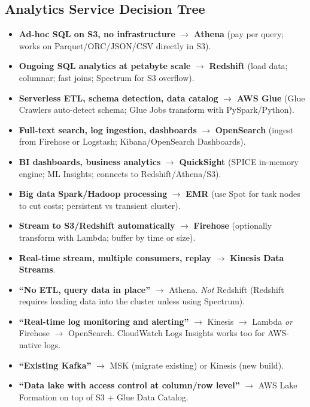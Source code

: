 \subsection{Analytics Service Decision Tree}

\begin{keyfacts}
\begin{itemize}
  \item \textbf{Ad-hoc SQL on S3, no infrastructure} $\to$ \textbf{Athena}
        (pay per query; works on Parquet/ORC/JSON/CSV directly in S3).
  \item \textbf{Ongoing SQL analytics at petabyte scale} $\to$ \textbf{Redshift}
        (load data; columnar; fast joins; Spectrum for S3 overflow).
  \item \textbf{Serverless ETL, schema detection, data catalog} $\to$ \textbf{AWS Glue}
        (Glue Crawlers auto-detect schema; Glue Jobs transform with PySpark/Python).
  \item \textbf{Full-text search, log ingestion, dashboards} $\to$ \textbf{OpenSearch}
        (ingest from Firehose or Logstash; Kibana/OpenSearch Dashboards).
  \item \textbf{BI dashboards, business analytics} $\to$ \textbf{QuickSight}
        (SPICE in-memory engine; ML Insights; connects to Redshift/Athena/S3).
  \item \textbf{Big data Spark/Hadoop processing} $\to$ \textbf{EMR}
        (use Spot for task nodes to cut costs; persistent vs transient cluster).
  \item \textbf{Stream to S3/Redshift automatically} $\to$ \textbf{Firehose}
        (optionally transform with Lambda; buffer by time or size).
  \item \textbf{Real-time stream, multiple consumers, replay} $\to$ \textbf{Kinesis Data Streams}.
\end{itemize}
\end{keyfacts}

\begin{examtip}[title={[!] Analytics exam traps}]
\begin{itemize}
  \item \textbf{``No ETL, query data in place''} $\to$ Athena. \emph{Not} Redshift
        (Redshift requires loading data into the cluster unless using Spectrum).
  \item \textbf{``Real-time log monitoring and alerting''} $\to$ Kinesis $\to$ Lambda
        \emph{or} Firehose $\to$ OpenSearch. CloudWatch Logs Insights works too for
        AWS-native logs.
  \item \textbf{``Existing Kafka''} $\to$ MSK (migrate existing) or Kinesis (new build).
  \item \textbf{``Data lake with access control at column/row level''} $\to$ AWS Lake Formation
        on top of S3 + Glue Data Catalog.
\end{itemize}
\end{examtip}

